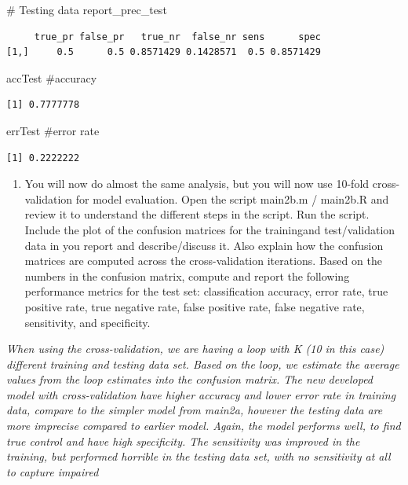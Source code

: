 \documentclass[
  letterpaper,
  DIV=11,
  numbers=noendperiod]{scrartcl}
\newenvironment{Shaded}{\begin{snugshade}}{\end{snugshade}}
\newcommand{\CommentTok}[1]{\textcolor[rgb]{0.37,0.37,0.37}{#1}}
\newcommand{\NormalTok}[1]{\textcolor[rgb]{0.00,0.23,0.31}{#1}}
\providecommand{\tightlist}{%
  \setlength{\itemsep}{0pt}\setlength{\parskip}{0pt}}\usepackage{longtable,booktabs,array}
\begin{document}
\begin{Shaded}
\begin{Highlighting}[]
\CommentTok{\# Testing data}
\NormalTok{report\_prec\_test}
\end{Highlighting}
\end{Shaded}

\begin{verbatim}
     true_pr false_pr   true_nr  false_nr sens      spec
[1,]     0.5      0.5 0.8571429 0.1428571  0.5 0.8571429
\end{verbatim}

\begin{Shaded}
\begin{Highlighting}[]
\NormalTok{accTest }\CommentTok{\#accuracy}
\end{Highlighting}
\end{Shaded}

\begin{verbatim}
[1] 0.7777778
\end{verbatim}

\begin{Shaded}
\begin{Highlighting}[]
\NormalTok{errTest }\CommentTok{\#error rate}
\end{Highlighting}
\end{Shaded}

\begin{verbatim}
[1] 0.2222222
\end{verbatim}

\begin{enumerate}
\def\labelenumi{(\alph{enumi})}
\setcounter{enumi}{4}
\tightlist
\item
  You will now do almost the same analysis, but you will now use 10-fold
  cross-validation for model evaluation. Open the script main2b.m /
  main2b.R and review it to understand the different steps in the
  script. Run the script. Include the plot of the confusion matrices for
  the trainingand test/validation data in you report and
  describe/discuss it. Also explain how the confusion matrices are
  computed across the cross-validation iterations. Based on the numbers
  in the confusion matrix, compute and report the following performance
  metrics for the test set: classification accuracy, error rate, true
  positive rate, true negative rate, false positive rate, false negative
  rate, sensitivity, and specificity.
\end{enumerate}

\emph{When using the cross-validation, we are having a loop with K (10
in this case) different training and testing data set. Based on the
loop, we estimate the average values from the loop estimates into the
confusion matrix. The new developed model with cross-validation have
higher accuracy and lower error rate in training data, compare to the
simpler model from main2a, however the testing data are more imprecise
compared to earlier model. Again, the model performs well, to find true
control and have high specificity. The sensitivity was improved in the
training, but performed horrible in the testing data set, with no
sensitivity at all to capture impaired}
\end{document}
